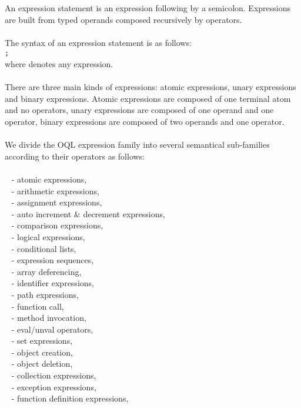 An expression statement is an expression following by a semicolon.
Expressions are built from typed operands composed recursively by operators.
\\
\\
The syntax of an expression statement is as follows:\\
\ex \texttt{;}\\
where \ex denotes any expression.\\
\\
There are three main kinds of expressions: atomic expressions,
unary expressions and binary expressions.
Atomic expressions are composed of one terminal atom and no operators,
unary expressions are composed
of one operand and one operator, binary expressions are composed
of two operands and one operator.
\\
\\
We divide the OQL expression family into several semantical sub-families
according to their operators as follows:\\\\
\mbox{ } - atomic expressions,\\
\mbox{ } - arithmetic expressions,\\
\mbox{ } - assignment expressions,\\
\mbox{ } - auto increment \& decrement expressions,\\
\mbox{ } - comparison expressions,\\
\mbox{ } - logical expressions,\\
\mbox{ } - conditional lists,\\
\mbox{ } - expression sequences,\\
\mbox{ } - array deferencing,\\
\mbox{ } - identifier expressions,\\
\mbox{ } - path expressions,\\
\mbox{ } - function call,\\
\mbox{ } - method invocation,\\
\mbox{ } - eval/unval operators,\\
\mbox{ } - set expressions,\\
\mbox{ } - object creation,\\
\mbox{ } - object deletion,\\
\mbox{ } - collection expressions,\\
\mbox{ } - exception expressions,\\
\mbox{ } - function definition expressions,\\
